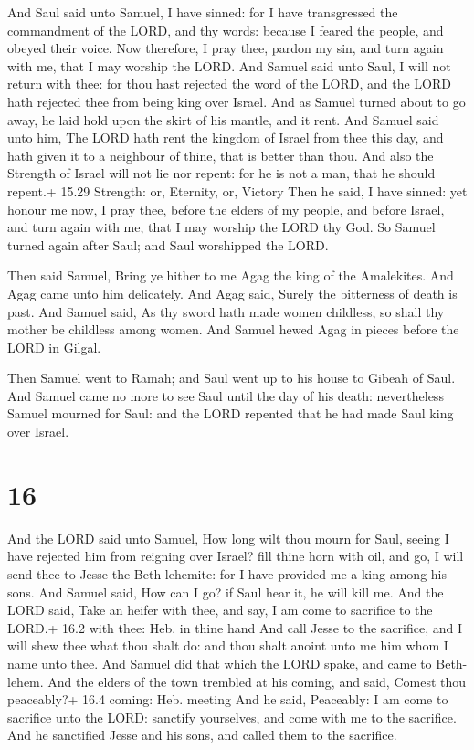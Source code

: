  And Saul said unto Samuel, I have sinned: for I have
transgressed the commandment of the LORD, and thy words: because I
feared the people, and obeyed their voice.  Now therefore,
I pray thee, pardon my sin, and turn again with me, that I may worship
the LORD.  And Samuel said unto Saul, I will not return
with thee: for thou hast rejected the word of the LORD, and the LORD
hath rejected thee from being king over Israel.  And as
Samuel turned about to go away, he laid hold upon the skirt of his
mantle, and it rent.  And Samuel said unto him, The LORD
hath rent the kingdom of Israel from thee this day, and hath given it to
a neighbour of thine, that is better than thou.  And also
the Strength of Israel will not lie nor repent: for he is not a man,
that he should repent.+ 15.29 Strength: or, Eternity, or, Victory
 Then he said, I have sinned: yet honour me now, I pray
thee, before the elders of my people, and before Israel, and turn again
with me, that I may worship the LORD thy God.  So Samuel
turned again after Saul; and Saul worshipped the LORD.

 Then said Samuel, Bring ye hither to me Agag the king of
the Amalekites. And Agag came unto him delicately. And Agag said, Surely
the bitterness of death is past.  And Samuel said, As thy
sword hath made women childless, so shall thy mother be childless among
women. And Samuel hewed Agag in pieces before the LORD in Gilgal.

 Then Samuel went to Ramah; and Saul went up to his house
to Gibeah of Saul.  And Samuel came no more to see Saul
until the day of his death: nevertheless Samuel mourned for Saul: and
the LORD repented that he had made Saul king over Israel.

\hypertarget{section-15}{%
\section{16}\label{section-15}}

 And the LORD said unto Samuel, How long wilt thou mourn for
Saul, seeing I have rejected him from reigning over Israel? fill thine
horn with oil, and go, I will send thee to Jesse the Beth-lehemite: for
I have provided me a king among his sons.  And Samuel said,
How can I go? if Saul hear it, he will kill me. And the LORD said, Take
an heifer with thee, and say, I am come to sacrifice to the LORD.+ 16.2
with thee: Heb. in thine hand  And call Jesse to the
sacrifice, and I will shew thee what thou shalt do: and thou shalt
anoint unto me him whom I name unto thee.  And Samuel did
that which the LORD spake, and came to Beth-lehem. And the elders of the
town trembled at his coming, and said, Comest thou peaceably?+ 16.4
coming: Heb. meeting  And he said, Peaceably: I am come to
sacrifice unto the LORD: sanctify yourselves, and come with me to the
sacrifice. And he sanctified Jesse and his sons, and called them to the
sacrifice.

